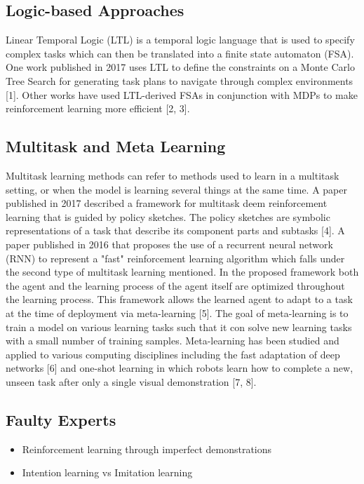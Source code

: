 \documentclass[letterpaper, 10 pt, conference]{ieeeconf}  %
\begin{document}
\subsection{Logic-based Approaches}

Linear Temporal Logic (LTL) is a temporal logic language that is used to specify complex tasks which can then be translated into a finite state automaton (FSA). One work published in 2017 uses LTL to define the constraints on a Monte Carlo Tree Search for generating task plans to navigate through complex environments [1]. Other works have used LTL-derived FSAs in conjunction with MDPs to make reinforcement learning more efficient [2, 3].

\subsection{Multitask and Meta Learning}

Multitask learning methods can refer to methods used to learn in a multitask setting, or when the model is learning several things at the same time. A paper published in 2017 described a framework for multitask deem reinforcement learning that is guided by policy sketches. The policy sketches are symbolic representations of a task that describe its component parts and subtasks [4]. A paper published in 2016 that proposes the use of a recurrent neural network (RNN) to represent a "fast" reinforcement learning algorithm which falls under the second type of multitask learning mentioned. In the proposed framework both the agent and the learning process of the agent itself are optimized throughout the learning process. This framework allows the learned agent to adapt to a task at the time of deployment via meta-learning [5].
\newline 
\indent The goal of meta-learning is to train a model on various learning tasks such that it con solve new learning tasks with a small number of training samples. Meta-learning has been studied and applied to various computing disciplines including the fast adaptation of deep networks [6] and one-shot learning in which robots learn how to complete a new, unseen task after only a single visual demonstration [7, 8]. 

\subsection{Faulty Experts}

\begin{itemize}
  \item Reinforcement learning through imperfect demonstrations
  \item Intention learning vs Imitation learning
\end{itemize}
\end{document}
